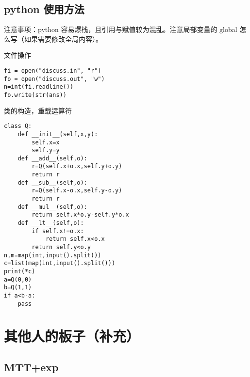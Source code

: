 \documentclass[12pt]{ctexart}
\begin{document}
\subsection{python 使用方法}

注意事项：python 容易爆栈，且引用与赋值较为混乱。注意局部变量的 global 怎么写（如果需要修改全局内容）。

文件操作

\begin{lstlisting}
fi = open("discuss.in", "r")
fo = open("discuss.out", "w")
n=int(fi.readline())
fo.write(str(ans))
\end{lstlisting}


类的构造，重载运算符
\begin{lstlisting}
class Q:
	def __init__(self,x,y):
		self.x=x
		self.y=y
	def __add__(self,o):
		r=Q(self.x+o.x,self.y+o.y)
		return r
	def __sub__(self,o):
		r=Q(self.x-o.x,self.y-o.y)
		return r
	def __mul__(self,o):
		return self.x*o.y-self.y*o.x
	def __lt__(self,o):
		if self.x!=o.x:
			return self.x<o.x
		return self.y<o.y
n,m=map(int,input().split())
c=list(map(int,input().split()))
print(*c)
a=Q(0,0)
b=Q(1,1)
if a<b-a:
	pass
\end{lstlisting}

\newpage

\section{其他人的板子（补充）}

\subsection{MTT+exp}
\end{document}
